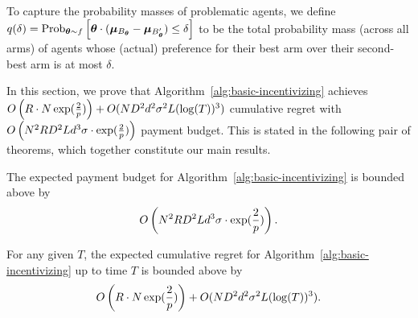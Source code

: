 To capture the probability masses of problematic agents,
we define
$\AlmostTied{\delta} = \Prob[\AgV \sim \AgentDist]{%
\AgV \cdot (\ArmV{\Best{\AgV}} - \ArmV{\Second{\AgV}}) \leq \delta}$
to be the total probability mass (across all arms) of agents
whose (actual) preference for their best arm over their second-best
arm is at most $\delta$.


In this section, we prove that Algorithm~\ref{alg:basic-incentivizing} achieves $O \left(R\cdot  N\exp(\frac{2}{p})\right) +
O(ND^2 d^2\sigma^2 L(\log(T))^3)$ cumulative regret with $O \left(N^2 R D^2 L d^3 \sigma\cdot \exp(\frac{2}{p}) \right)$ payment budget.  This is stated in the following pair of theorems, which together constitute our main results.


\begin{theorem}
The expected payment budget for
Algorithm~\ref{alg:basic-incentivizing} is bounded above by
\begin{align}
O \left(N^2 R D^2 L d^3 \sigma\cdot \exp(\frac{2}{p}) \right). \nonumber 
\end{align} 
\label{rst:budget}
\end{theorem}


\begin{theorem}
For any given $T$, the expected cumulative regret for
Algorithm~\ref{alg:basic-incentivizing} up to time $T$ is bounded
above by 
\begin{align}
O \left(R\cdot  N\exp(\frac{2}{p})\right) +
O(ND^2 d^2\sigma^2 L(\log(T))^3).
\end{align}
\label{rst:regret}
\end{theorem}

